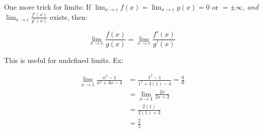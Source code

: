 One more trick for limits: If $\lim_{x \rightarrow c} f(x) = \lim_{x \rightarrow c} g(x) = 0$ or $= \pm \infty$, \emph{and} $\lim_{x \rightarrow c} \frac{f'(x)}{g'(x)}$ exists, then:

\begin{equation*}
    \lim_{x \rightarrow c} \frac{f(x)}{g(x)} = \lim_{x \rightarrow c} \frac{f'(x)}{g'(x)}
\end{equation*}

\noindent This is useful for undefined limits. Ex:

\begin{align*}
    \lim_{x \rightarrow 1} \frac{x^2 - 1}{x^2 + 3x - 4} & = 
        \frac{1^2 - 1}{1^2 + 3(1) - 4} = \frac{0}{0} \\
    & = \lim_{x \rightarrow 1} \frac{2x}{2x + 3} \\
    & = \frac{2(1)}{2(1) + 3} \\
    & = \frac{2}{5}
\end{align*}